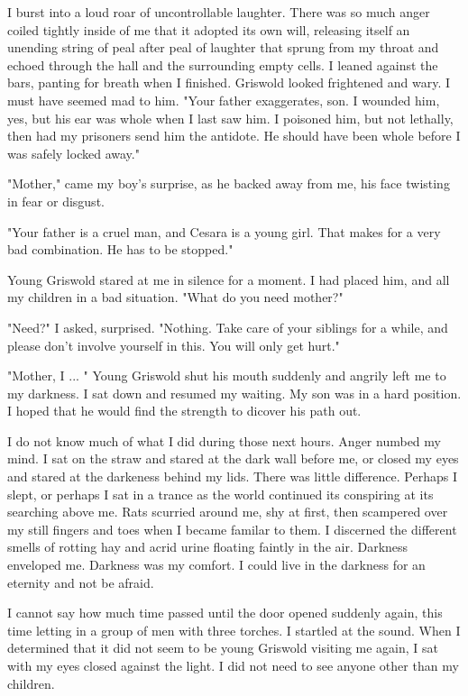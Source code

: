 \documentclass{article}
\begin{document}
I burst into a loud roar of uncontrollable laughter. There was so much anger coiled tightly inside of me that it adopted its own will, releasing itself an unending string of peal after peal of laughter that sprung from my throat and echoed through the hall and the surrounding empty cells. I leaned against the bars, panting for breath when I finished. Griswold looked frightened and wary. I must have seemed mad to him. "Your father exaggerates, son. I wounded him, yes, but his ear was whole when I last saw him. I poisoned him, but not lethally, then had my prisoners send him the antidote. He should have been whole before I was safely locked away."

"Mother," came my boy's surprise, as he backed away from me, his face twisting in fear or disgust.

"Your father is a cruel man, and Cesara is a young girl. That makes for a very bad combination. He has to be stopped."

Young Griswold stared at me in silence for a moment. I had placed him, and all my children in a bad situation. "What do you need mother?"

"Need?" I asked, surprised. "Nothing. Take care of your siblings for a while, and please don't involve yourself in this. You will only get hurt."

"Mother, I ... " Young Griswold shut his mouth suddenly and angrily left me to my darkness. I sat down and resumed my waiting. My son was in a hard position. I hoped that he would find the strength to dicover his path out. 

I do not know much of what I did during those next hours. Anger numbed my mind. I sat on the straw and stared at the dark wall before me, or closed my eyes and stared at the darkeness behind my lids. There was little difference. Perhaps I slept, or perhaps I sat in a trance as the world continued its conspiring at its searching above me. Rats scurried around me, shy at first, then scampered over my still fingers and toes when I became familar to them. I discerned the different smells of rotting hay and acrid urine floating faintly in the air. Darkness enveloped me. Darkness was my comfort. I could live in the darkness for an eternity and not be afraid.

I cannot say how much time passed until the door opened suddenly again, this time letting in a group of men with three torches. I startled at the sound. When I determined that it did not seem to be young Griswold visiting me again, I sat with my eyes closed against the light. I did not need to see anyone other than my children. 
\end{document}
